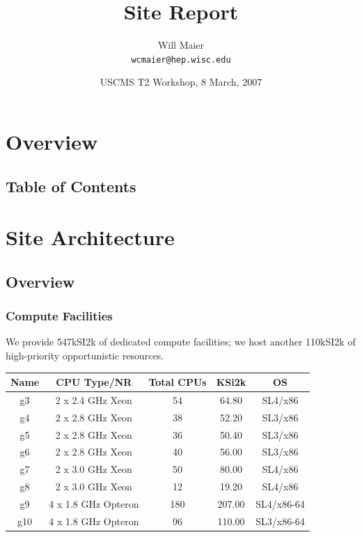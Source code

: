 \documentclass{beamer}
\title{Site Report}
\author[Will Maier]{Will Maier \\ \texttt{wcmaier@hep.wisc.edu}}
\institute[Wisconsin]{University of Wisconsin - High Energy Physics}
\date[8 March, 2007]{USCMS T2 Workshop, 8 March, 2007}
\begin{document}

\begin{frame}
    \titlepage
\end{frame}

\section{Overview}
\subsection{Table of Contents}
\begin{frame}
    \tableofcontents
\end{frame}

\section{Site Architecture}
\subsection{Overview}
\begin{frame}
\frametitle{Compute Facilities}
We provide 547kSI2k of dedicated compute facilities; we host another 110kSI2k 
of high-priority opportunistic resources.
\begin{tabular}[c]{|c|c|c|c|c|}
\hline
{\bf Name}   & {\bf CPU Type/NR} & {\bf Total CPUs}  & {\bf KSi2k}   & {\bf OS} \\
\hline
g3  & 2 x 2.4 GHz Xeon      & 54    & 64.80     & SL4/x86 \\
g4  & 2 x 2.8 GHz Xeon      & 38    & 52.20     & SL3/x86 \\
g5  & 2 x 2.8 GHz Xeon      & 36    & 50.40     & SL3/x86 \\
g6  & 2 x 2.8 GHz Xeon      & 40    & 56.00     & SL3/x86 \\
g7  & 2 x 3.0 GHz Xeon      & 50    & 80.00     & SL4/x86 \\
g8  & 2 x 3.0 GHz Xeon      & 12    & 19.20     & SL4/x86 \\
g9  & 4 x 1.8 GHz Opteron   & 180   & 207.00    & SL4/x86-64 \\
g10 & 4 x 1.8 GHz Opteron   & 96    & 110.00    & SL3/x86-64\footnotemark[1] \\
\hline
\end{tabular}
\end{frame}
\end{document}
